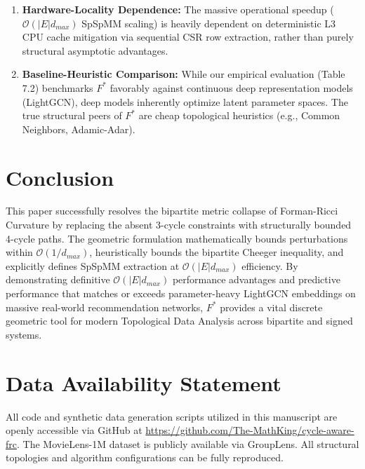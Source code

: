 \documentclass{siuro250211}
\begin{document}
\begin{enumerate}
    \item \textbf{Hardware-Locality Dependence:} The massive operational speedup ($\mathcal{O}(|E|d_{max})$ SpSpMM scaling) is heavily dependent on deterministic L3 CPU cache mitigation via sequential CSR row extraction, rather than purely structural asymptotic advantages.
    \item \textbf{Baseline-Heuristic Comparison:} While our empirical evaluation (Table 7.2) benchmarks $F^*$ favorably against continuous deep representation models (LightGCN), deep models inherently optimize latent parameter spaces. The true structural peers of $F^*$ are cheap topological heuristics (e.g., Common Neighbors, Adamic-Adar).
\end{enumerate}

\section{Conclusion}
This paper successfully resolves the bipartite metric collapse of Forman-Ricci Curvature by replacing the absent 3-cycle constraints with structurally bounded 4-cycle paths. The geometric formulation mathematically bounds perturbations within $\mathcal{O}(1/d_{max})$, heuristically bounds the bipartite Cheeger inequality, and explicitly defines SpSpMM extraction at $\mathcal{O}(|E| d_{max})$ efficiency. By demonstrating definitive $\mathcal{O}(|E|d_{max})$ performance advantages and predictive performance that matches or exceeds parameter-heavy LightGCN embeddings on massive real-world recommendation networks, $F^*$ provides a vital discrete geometric tool for modern Topological Data Analysis across bipartite and signed systems.

\section*{Data Availability Statement}
All code and synthetic data generation scripts utilized in this manuscript are openly accessible via GitHub at \url{https://github.com/The-MathKing/cycle-aware-frc}. The MovieLens-1M dataset is publicly available via GroupLens. All structural topologies and algorithm configurations can be fully reproduced.



\end{document}
